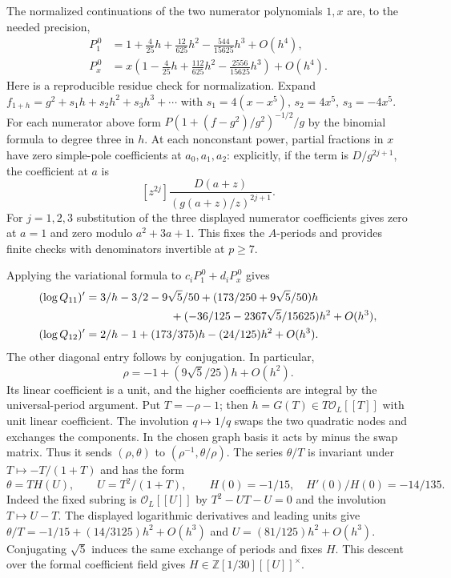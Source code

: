 \documentclass[11pt]{article}
\newcommand{\Z}{\mathbb Z}
\begin{document}
The normalized continuations of the two numerator polynomials $1,x$
are, to the needed precision,
\begin{align*}
 P_{1}^{\,0}&=1+\tfrac4{25}h+\tfrac{12}{625}h^2
                  -\tfrac{544}{15625}h^3+O(h^4),\\
 P_x^{\,0}&=x(1-\tfrac4{25}h+\tfrac{112}{625}h^2
                   -\tfrac{2556}{15625}h^3)+O(h^4).
\end{align*}
Here is a reproducible residue check for normalization. Expand
$f_{1+h}=g^2+s_1h+s_2h^2+s_3h^3+\cdots$ with
$s_1=4(x-x^5),\,s_2=4x^5,\,s_3=-4x^5$.
For each numerator above form $P(1+(f-g^2)/g^2)^{-1/2}/g$ by the
binomial formula to degree three in $h$. At each nonconstant power,
partial fractions in $x$ have zero simple-pole coefficients at
$a_0,a_1,a_2$: explicitly, if the term is $D/g^{2j+1}$, the coefficient
at $a$ is
\[
 [z^{2j}]\frac{D(a+z)}
                  {(g(a+z)/z)^{2j+1}} .
\]
For $j=1,2,3$ substitution of the three displayed numerator
coefficients gives zero at $a=1$ and zero modulo $a^2+3a+1$.
This fixes the $A$-periods and provides finite checks with denominators
invertible at $p\ge7$.

Applying the variational formula to $c_iP_{1}^{\,0}+d_iP_x^{\,0}$ gives
\begin{align*}
 (\log Q_{11})'={}&3/h-3/2-9\sqrt5/50
 +(173/250+9\sqrt5/50)h\\
 &\hspace{22mm}+(-36/125-2367\sqrt5/15625)h^2+O(h^3),\\
 (\log Q_{12})'={}&2/h-1+(173/375)h-(24/125)h^2+O(h^3).
\end{align*}
The other diagonal entry follows by conjugation. In particular,
\[
 \rho=-1+(9\sqrt5/25)h+O(h^2).
\]
Its linear coefficient is a unit, and the higher coefficients are
integral by the universal-period argument. Put $T=-\rho-1$; then
$h=G(T)\in T\mathcal O_L[[T]]$ with unit linear coefficient.
The involution $q\mapsto1/q$ swaps the two quadratic nodes and
exchanges the components. In the chosen graph basis it acts by minus
the swap matrix. Thus it sends $(\rho,\theta)$ to
$(\rho^{-1},\theta/\rho)$. The series $\theta/T$ is invariant under
$T\mapsto-T/(1+T)$ and has the form
\[
 \theta=T H(U),\qquad U=T^2/(1+T),\qquad
 H(0)=-1/15,\quad H'(0)/H(0)=-14/135 .
\]
Indeed the fixed subring is $\mathcal O_L[[U]]$ by
$T^2-UT-U=0$ and the involution $T\mapsto U-T$.
The displayed logarithmic derivatives and leading units give
$\theta/T=-1/15+(14/3125)h^2+O(h^3)$ and
$U=(81/125)h^2+O(h^3)$. Conjugating $\sqrt5$ induces the same exchange
of periods and fixes $H$. This descent over the formal coefficient
field gives $H\in\Z[1/30][[U]]^\times$.
\end{document}
